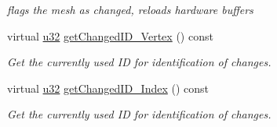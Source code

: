 \begin{DoxyCompactItemize}
\begin{DoxyCompactList}\small\item\em flags the mesh as changed, reloads hardware buffers \end{DoxyCompactList}\item 
virtual \hyperlink{namespaceirr_a0416a53257075833e7002efd0a18e804}{u32} \hyperlink{classirr_1_1scene_1_1CMeshBuffer_a99abc7d5f5a9f34221c58a598b33ce3a}{get\+Changed\+I\+D\+\_\+\+Vertex} () const
\begin{DoxyCompactList}\small\item\em Get the currently used ID for identification of changes. \end{DoxyCompactList}\item 
virtual \hyperlink{namespaceirr_a0416a53257075833e7002efd0a18e804}{u32} \hyperlink{classirr_1_1scene_1_1CMeshBuffer_aec6786022abd81ddf8d4e79a23628944}{get\+Changed\+I\+D\+\_\+\+Index} () const
\begin{DoxyCompactList}\small\item\em Get the currently used ID for identification of changes. \end{DoxyCompactList}\end{DoxyCompactItemize}
